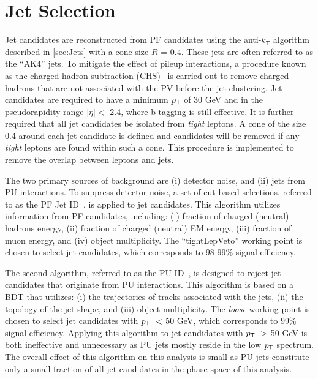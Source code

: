 \section{Jet Selection}
\label{sec:Jets}

Jet candidates are reconstructed from \ac{PF} candidates using the anti-$k_{\textsf{T}}$ algorithm~\cite{Cacciari:2008gp} described in \autoref{sec:Jets} with a cone size $R$ = 0.4. These jets are often referred to as the ``AK4'' jets. To mitigate the effect of pileup interactions, a procedure known as the charged hadron subtraction (CHS)~\cite{CMS:2014ata} is carried out to remove charged hadrons that are not associated with the \ac{PV} before the jet clustering. Jet candidates are required to have a minimum $p_{\textsf{T}}$ of 30 GeV and in the pseudorapidity range $|\eta|<$ 2.4, where b-tagging is still effective. It is further required that all jet candidates be isolated from \emph{tight} leptons. A cone of the size 0.4 around each jet candidate is defined and candidates will be removed if any \emph{tight} leptons are found within such a cone. This procedure is implemented to remove the overlap between leptons and jets. 

The two primary sources of background are (i) detector noise, and (ii) jets from \ac{PU} interactions. To suppress detector noise, a set of cut-based selections, referred to as the \ac{PF} Jet ID~\cite{CMS:2017wyc}, is applied to jet candidates. This algorithm utilizes information from \ac{PF} candidates, including: (i) fraction of charged (neutral) hadrons energy, (ii) fraction of charged (neutral) EM energy, (iii) fraction of muon energy, and (iv) object multiplicity. The ``tightLepVeto'' working point is chosen to select jet candidates, which corresponds to 98-99\% signal efficiency.

The second algorithm, referred to as the \ac{PU} ID~\cite{CMS:2013wea,PUJet:2020}, is designed to reject jet candidates that originate from \ac{PU} interactions. This algorithm is based on a \ac{BDT} that utilizes: (i) the trajectories of tracks associated with the jets, (ii) the topology of the jet shape, and (iii) object multiplicity. The \emph{loose} working point is chosen to select jet candidates with $p_{\textsf{T}}~<$ 50 GeV, which corresponds to 99\% signal efficiency. Applying this algorithm to jet candidates with $p_{\textsf{T}}~>$ 50 GeV is both ineffective and unnecessary as \ac{PU} jets mostly reside in the low $p_{\textsf{T}}$ spectrum. The overall effect of this algorithm on this analysis is small as \ac{PU} jets constitute only a small fraction of all jet candidates in the phase space of this analysis. 

